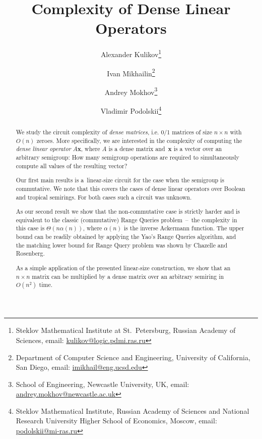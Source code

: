 \documentclass[11pt,letterpaper]{article}
\begin{document}

\sloppy
\author{
Alexander Kulikov\thanks{Steklov Mathematical Institute at St.~Petersburg, Russian Academy of Sciences, email: \href{mailto:kulikov@logic.pdmi.ras.ru}{kulikov@logic.pdmi.ras.ru}} 
\and 
Ivan Mikhailin\thanks{Department of Computer Science and Engineering, University
of California, San Diego, email: \href{mailto:imikhail@eng.ucsd.edu}{imikhail@eng.ucsd.edu}} \and 
Andrey Mokhov\thanks{School of Engineering, Newcastle University, UK, email: \href{mailto:andrey.mokhov@newcastle.ac.uk}{andrey.mokhov@newcastle.ac.uk}} 
\and 
Vladimir Podolskii\thanks{Steklov Mathematical Institute, Russian Academy of Sciences and
National Research University Higher School of Economics, Moscow, email: \href{mailto:podolskii@mi-ras.ru}{podolskii@mi-ras.ru}}}
\date{}
\title{Complexity of Dense Linear Operators}
\maketitle

\begin{abstract}
We study the circuit complexity of \emph{dense matrices}, i.e. 0/1 matrices of size
$n \times n$ with $O(n)$ zeroes. More specifically, we are interested in
the complexity of computing the \emph{dense linear operator} $A\mathbf{x}$,
where $A$ is a dense matrix and~$\mathbf{x}$ is a vector over an arbitrary
semigroup: How many semigroup operations are required to simultaneously compute
all values of the resulting vector?

Our first main results is a~linear-size circuit for the case
when the semigroup is commutative. We note that this covers the cases of dense linear operators over Boolean and tropical semirings. For both cases such a circuit was unknown.

As our second result we show that the non-commutative
case is strictly harder and is equivalent to the classic (commutative) Range Queries
problem~--~the complexity in this case is $\Theta(n\alpha(n))$, where $\alpha(n)$ is the
inverse Ackermann function. The upper bound can be readily
obtained by applying the Yao's Range Queries algorithm, and the matching lower bound for Range Query problem was shown by
Chazelle and Rosenberg.

As a simple application of the presented linear-size construction, we show that
an $n\times n$ matrix can be multiplied by a dense matrix over an arbitrary
semiring in $O(n^2)$ time.

\end{abstract}
\end{document}

